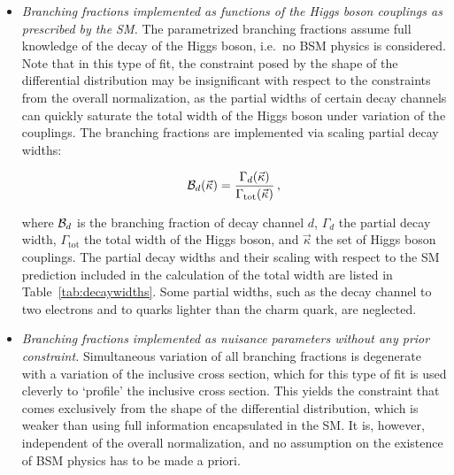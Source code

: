 \begin{itemize}
\item
    \emph{Branching fractions implemented as functions of the Higgs boson couplings as prescribed by the SM.}
    The parametrized branching fractions assume full knowledge of the decay of the Higgs boson, i.e.\ no BSM physics is considered.
    Note that in this type of fit, the constraint posed by the shape of the differential distribution may be insignificant with respect to the constraints from the overall normalization, as the partial widths of certain decay channels can quickly saturate the total width of the Higgs boson under variation of the couplings.
    The branching fractions are implemented via scaling partial decay widths:
    \begin{linenomath*}
    \begin{equation}
    \mathcal{B}_d (\vec{\kappa}) = 
        \frac{
        \Gamma_d(\vec{\kappa})
        }{
        \Gamma_\text{tot}(\vec{\kappa})
        }
    \,,
    \end{equation}
    \end{linenomath*}
    where $\mathcal{B}_d$ is the branching fraction of decay channel $d$, $\Gamma_d$ the partial decay width, $\Gamma_\text{tot}$ the total width of the Higgs boson, and $\vec{\kappa}$ the set of Higgs boson couplings.
    The partial decay widths and their scaling with respect to the SM prediction included in the calculation of the total width are listed in Table~\ref{tab:decaywidths}.
    Some partial widths, such as the decay channel to two electrons and to quarks lighter than the charm quark, are neglected.
% 
\item
    \emph{Branching fractions implemented as nuisance parameters without any prior constraint.}
    Simultaneous variation of all branching fractions is degenerate with a variation of the inclusive cross section, which for this type of fit is used cleverly to `profile' the inclusive cross section.
    This yields the constraint that comes exclusively from the shape of the differential distribution, which is weaker than using full information encapsulated in the SM.
    It is, however, independent of the overall normalization, and no assumption on the existence of BSM physics has to be made a priori.
\end{itemize}



